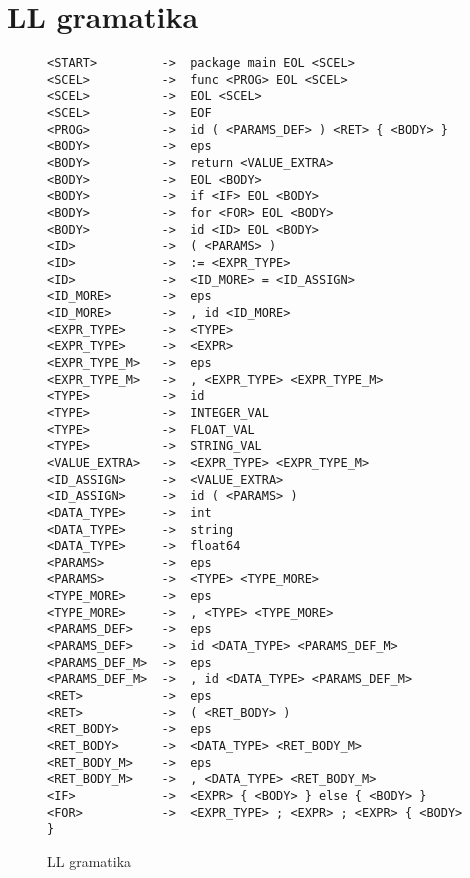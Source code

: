 \documentclass[czech,a4paper,12pt]{article}[]
\begin{document}
    \section{LL gramatika}
    \begin{figure}[h!]
        \begin{Verbatim}[fontsize=\relsize{-0.5}]
<START>         ->  package main EOL <SCEL> 
<SCEL>          ->  func <PROG> EOL <SCEL>
<SCEL>          ->  EOL <SCEL>
<SCEL>          ->  EOF
<PROG>          ->  id ( <PARAMS_DEF> ) <RET> { <BODY> }
<BODY>          ->  eps
<BODY>          ->  return <VALUE_EXTRA>
<BODY>          ->  EOL <BODY>
<BODY>          ->  if <IF> EOL <BODY>
<BODY>          ->  for <FOR> EOL <BODY>
<BODY>          ->  id <ID> EOL <BODY>
<ID>            ->  ( <PARAMS> )
<ID>            ->  := <EXPR_TYPE>
<ID>            ->  <ID_MORE> = <ID_ASSIGN>
<ID_MORE>       ->  eps
<ID_MORE>       ->  , id <ID_MORE>  
<EXPR_TYPE>     ->  <TYPE>
<EXPR_TYPE>     ->  <EXPR>
<EXPR_TYPE_M>   ->  eps
<EXPR_TYPE_M>   ->  , <EXPR_TYPE> <EXPR_TYPE_M>
<TYPE>          ->  id
<TYPE>          ->  INTEGER_VAL
<TYPE>          ->  FLOAT_VAL
<TYPE>          ->  STRING_VAL
<VALUE_EXTRA>   ->  <EXPR_TYPE> <EXPR_TYPE_M>
<ID_ASSIGN>     ->  <VALUE_EXTRA>
<ID_ASSIGN>     ->  id ( <PARAMS> )
<DATA_TYPE>     ->  int
<DATA_TYPE>     ->  string
<DATA_TYPE>     ->  float64
<PARAMS>        ->  eps
<PARAMS>        ->  <TYPE> <TYPE_MORE>
<TYPE_MORE>     ->  eps
<TYPE_MORE>     ->  , <TYPE> <TYPE_MORE>
<PARAMS_DEF>    ->  eps
<PARAMS_DEF>    ->  id <DATA_TYPE> <PARAMS_DEF_M> 
<PARAMS_DEF_M>  ->  eps
<PARAMS_DEF_M>  ->  , id <DATA_TYPE> <PARAMS_DEF_M>
<RET>           ->  eps
<RET>           ->  ( <RET_BODY> )
<RET_BODY>      ->  eps
<RET_BODY>      ->  <DATA_TYPE> <RET_BODY_M>
<RET_BODY_M>    ->  eps
<RET_BODY_M>    ->  , <DATA_TYPE> <RET_BODY_M>
<IF>            ->  <EXPR> { <BODY> } else { <BODY> }
<FOR>           ->  <EXPR_TYPE> ; <EXPR> ; <EXPR> { <BODY> }
        \end{Verbatim}
        \caption{LL gramatika}
    \end{figure}
    \label{gramatika}
    
    \newpage
\end{document}
